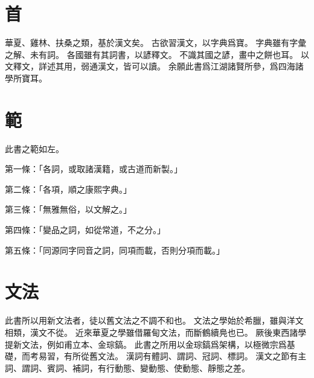 \section{首}
華夏、雞林、扶桑之類，基於漢文矣。
古欲習漢文，以字典爲寶。
字典雖有字彙之解、未有詞。
各國雖有其詞書，以諺釋文。
不識其國之諺，畫中之餅也耳。
以文釋文，詳述其用，弱通漢文，皆可以讀。
余願此書爲江湖諸賢所參，爲四海諸學所寶耳。
\section{範}
此書之範如左。
\par 第一條：「各詞，或取諸漢籍，或古道而新製。」
\par 第二條：「各項，順之康熙字典。」
\par 第三條：「無雅無俗，以文解之。」
\par 第四條：「變品之詞，如從常道，不之分。」
\par 第五條：「同源同字同音之詞，同項而載，否則分項而載。」
\section{文法}
此書所以用新文法者，徒以舊文法之不調不和也。
文法之學始於希臘，雖與洋文相類，漢文不從。
近來華夏之學雖借羅甸文法，而斷鶴續鳧也已。
厥後東西諸學提新文法，例如甫立本、金琮鎬。
此書之所用以金琮鎬爲架構，以極微宗爲基礎，而考易習，有所從舊文法。
漢詞有體詞、謂詞、冠詞、標詞。
漢文之節有主詞、謂詞、賓詞、補詞，有行動態、變動態、使動態、靜態之差。
